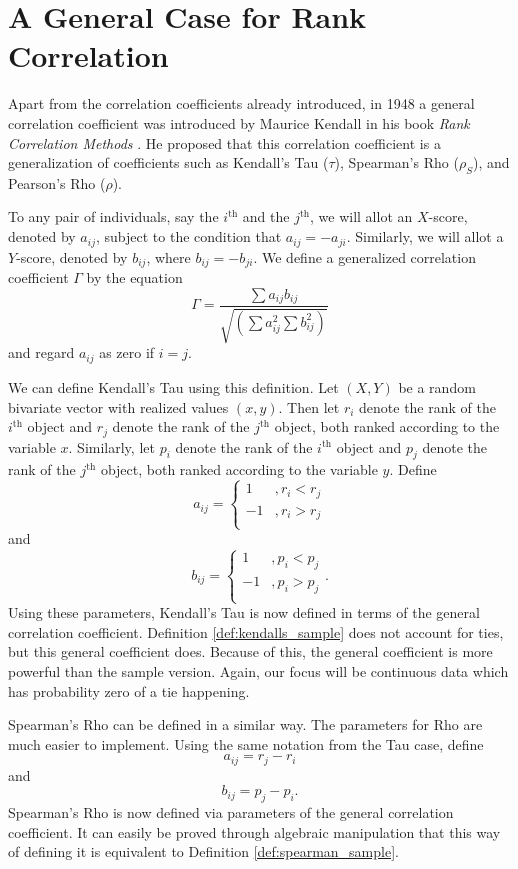 \section{A General Case for Rank Correlation}\label{sec:general_coefficient}
\hspace{24pt} Apart from the correlation coefficients already introduced, in 1948 a general correlation coefficient was introduced by Maurice Kendall in his book {\it Rank Correlation Methods} \cite{kendall1990}. He proposed that this correlation coefficient is a generalization of coefficients such as Kendall's Tau ($\tau$), Spearman's Rho ($\rho_S$), and Pearson's Rho ($\rho$).
\begin{definition}\label{def:general_coefficient}
    To any pair of individuals, say the $i^{\text{th}}$ and the $j^{\text{th}}$, we will allot an $X$-score, denoted by $a_{ij}$, subject to the condition that $a_{ij}=-a_{ji}$. Similarly, we will allot a $Y$-score, denoted by $b_{ij}$, where $b_{ij}=-b_{ji}$. We define a generalized correlation coefficient $\Gamma$ by the equation $$\Gamma=\frac{\sum a_{ij}b_{ij}}{\sqrt{\left(\sum a_{ij}^2\sum b_{ij}^2\right)}}$$ and regard $a_{ij}$ as zero if $i=j$.
\end{definition}
We can define Kendall's Tau using this definition. Let $(X,Y)$ be a random bivariate vector with realized values $(x,y)$. Then let $r_i$ denote the rank of the $i^{\text{th}}$ object and $r_j$ denote the rank of the $j^{\text{th}}$ object, both ranked according to the variable $x$. Similarly, let $p_i$ denote the rank of the $i^{\text{th}}$ object and $p_j$ denote the rank of the $j^{\text{th}}$ object, both ranked according to the variable $y$. Define $$a_{ij}=\begin{cases}1 & ,r_i<r_j\\ -1 & ,r_i>r_j\\ \end{cases}$$ and $$b_{ij}=\begin{cases}1 & ,p_i<p_j\\ -1 & ,p_i>p_j\\ \end{cases}.$$ Using these parameters, Kendall's Tau is now defined in terms of the general correlation coefficient. Definition \ref{def:kendalls_sample} does not account for ties, but this general coefficient does. Because of this, the general coefficient is more powerful than the sample version. Again, our focus will be continuous data which has probability zero of a tie happening.

Spearman's Rho can be defined in a similar way. The parameters for Rho are much easier to implement. Using the same notation from the Tau case, define $$a_{ij}=r_j-r_i$$ and $$b_{ij}=p_j-p_i.$$ Spearman's Rho is now defined via parameters of the general correlation coefficient. It can easily be proved through algebraic manipulation that this way of defining it is equivalent to Definition \ref{def:spearman_sample}.

